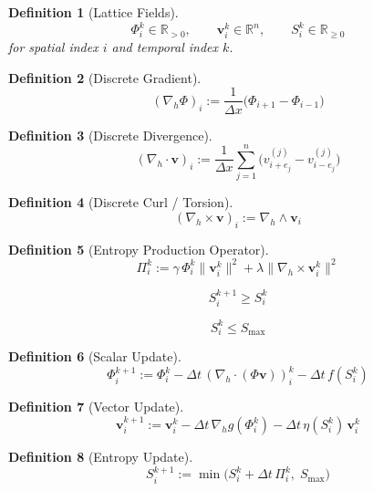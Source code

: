 \documentclass[11pt,oneside]{book}
\newtheorem{definition}{Definition}[chapter]
\begin{document}
\begin{definition}[Lattice Fields]
\[
\Phi_{i}^{k} \in \mathbb{R}_{>0}, \qquad
\mathbf{v}_{i}^{k} \in \mathbb{R}^n, \qquad
S_{i}^{k} \in \mathbb{R}_{\ge 0}
\]
for spatial index $i$ and temporal index $k$.
\end{definition}

\begin{definition}[Discrete Gradient]
\[
(\nabla_h \Phi)_i
:= \frac{1}{\Delta x}
\big(\Phi_{i+1} - \Phi_{i-1}\big)
\]
\end{definition}

\begin{definition}[Discrete Divergence]
\[
(\nabla_h \cdot \mathbf{v})_i
:= \frac{1}{\Delta x}
\sum_{j=1}^n
\big(v^{(j)}_{i+e_j} - v^{(j)}_{i-e_j}\big)
\]
\end{definition}

\begin{definition}[Discrete Curl / Torsion]
\[
(\nabla_h \times \mathbf{v})_i
:= \nabla_h \wedge \mathbf{v}_i
\]
\end{definition}

\begin{definition}[Entropy Production Operator]
\[
\Pi_i^k
:= \gamma\,\Phi_i^k \|\mathbf{v}_i^k\|^2
+ \lambda \|\nabla_h \times \mathbf{v}_i^k\|^2
\]
\end{definition}

\begin{constraint}
\[
S_i^{k+1} \ge S_i^{k}
\]
\end{constraint}

\begin{constraint}
\[
S_i^{k} \le S_{\max}
\]
\end{constraint}

\begin{definition}[Scalar Update]
\[
\Phi_i^{k+1}
:= \Phi_i^k
- \Delta t\,(\nabla_h \cdot (\Phi \mathbf{v}))_i^k
- \Delta t\,f(S_i^k)
\]
\end{definition}

\begin{definition}[Vector Update]
\[
\mathbf{v}_i^{k+1}
:= \mathbf{v}_i^k
- \Delta t\,\nabla_h g(\Phi_i^k)
- \Delta t\,\eta(S_i^k)\,\mathbf{v}_i^k
\]
\end{definition}

\begin{definition}[Entropy Update]
\[
S_i^{k+1}
:= \min\Big(
S_i^k + \Delta t\,\Pi_i^k,\;
S_{\max}
\Big)
\]
\end{definition}
\end{document}
